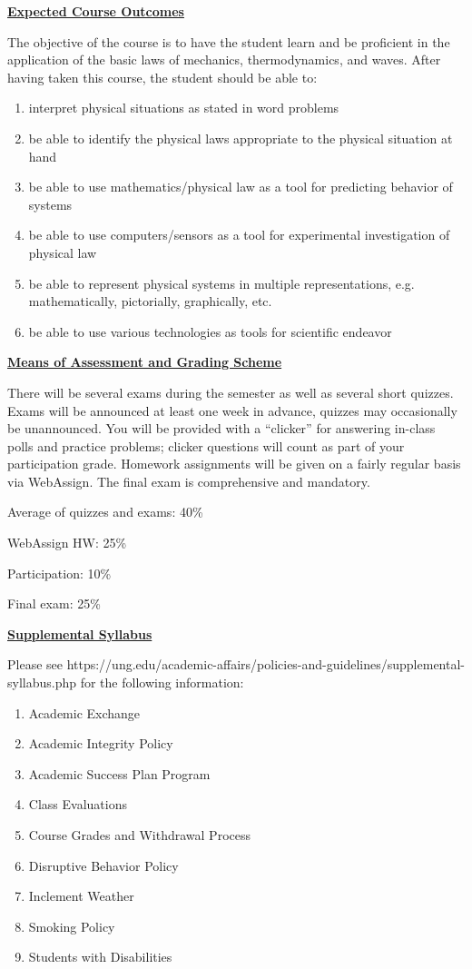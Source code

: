 \documentclass[12pt]{article}
\begin{document}
\underline{\textbf{Expected Course Outcomes}} \par
The objective of the course is to have the student learn and be proficient in the application of the basic laws of mechanics, thermodynamics, and waves.
After having taken this course, the student should be able to:
\begin{enumerate}
\item interpret physical situations as stated in word problems
\item be able to identify the physical laws appropriate to the physical situation at hand
\item be able to use mathematics/physical law as a tool for predicting behavior of systems
\item be able to use computers/sensors as a tool for experimental investigation of physical law
\item be able to represent physical systems in multiple representations, e.g. mathematically, pictorially, graphically, etc.
\item be able to use various technologies as tools for scientific endeavor
\end{enumerate}
\hfill \break

\underline{\textbf{Means of Assessment and Grading Scheme}} \par
There will be several exams during the semester as well as several short quizzes.
Exams will be announced at least one week in advance, quizzes may occasionally be unannounced.
You will be provided with a “clicker” for answering in-class polls and practice problems; clicker questions will count as part of your participation grade.
Homework assignments will be given on a fairly regular basis via WebAssign.
The final exam is comprehensive and mandatory. \par
\hfill \break
Average of quizzes and exams: 40\% \par
WebAssign HW: 25\% \par
Participation: 10\% \par
Final exam: 25\%
\hfill \break

\underline{\textbf{Supplemental Syllabus}} \par
Please see https://ung.edu/academic-affairs/policies-and-guidelines/supplemental-syllabus.php for the following information:
\begin{enumerate}
\item Academic Exchange
\item Academic Integrity Policy
\item Academic Success Plan Program
\item Class Evaluations
\item Course Grades and Withdrawal Process
\item Disruptive Behavior Policy
\item Inclement Weather
\item Smoking Policy
\item Students with Disabilities
\end{enumerate}
\end{document}
